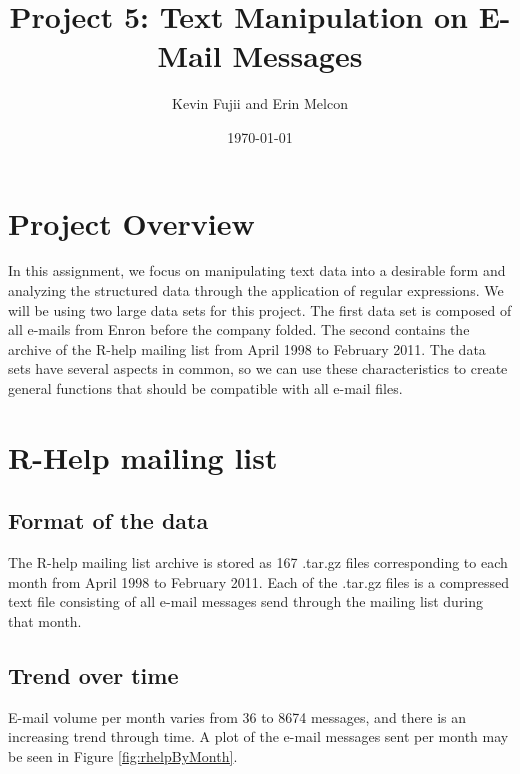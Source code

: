\documentclass[12pt, a4paper, oneside]{amsart}
\title{Project 5: Text Manipulation on E-Mail Messages}
\author{Kevin Fujii and Erin Melcon}
\date{\today}
\begin{document}
\maketitle

\section{Project Overview}

In this assignment, we focus on manipulating text data into a desirable form and analyzing the structured data through the application of regular expressions.  We will be using two large data sets for this project.  The first data set is composed of all e-mails from Enron before the company folded.  The second contains the archive of the R-help mailing list from April 1998 to February 2011.  The data sets have several aspects in common, so we can use these characteristics to create general functions that should be compatible with all e-mail files.

\section{R-Help mailing list}

\subsection{Format of the data}

The R-help mailing list archive is stored as 167 .tar.gz files corresponding to each month from April 1998 to February 2011.  Each of the .tar.gz files is a compressed text file consisting of all e-mail messages send through the mailing list during that month.  

\subsection{Trend over time}

E-mail volume per month varies from 36 to 8674 messages, and there is an increasing trend through time.  A plot of the e-mail messages sent per month may be seen in Figure \ref{fig:rhelpByMonth}.
\end{document}
